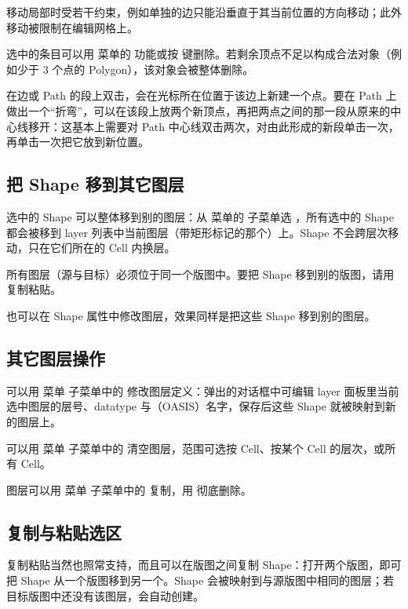 移动局部时受若干约束，例如单独的边只能沿垂直于其当前位置的方向移动；此外移动被限制在编辑网格上。

选中的条目可以用  菜单的  功能或按  键删除。若剩余顶点不足以构成合法对象（例如少于 3 个点的 Polygon），该对象会被整体删除。

在边或 Path 的段上双击，会在光标所在位置于该边上新建一个点。要在 Path 上做出一个“折弯”，可以在该段上放两个新顶点，再把两点之间的那一段从原来的中心线移开：这基本上需要对 Path 中心线双击两次，对由此形成的新段单击一次，再单击一次把它放到新位置。

\subsection{把 Shape 移到其它图层}\label{sec:move_layer_sel}

选中的 Shape 可以整体移到别的图层：从  菜单的  子菜单选 ，所有选中的 Shape 都会被移到 layer 列表中当前图层（带矩形标记的那个）上。Shape 不会跨层次移动，只在它们所在的 Cell 内换层。

所有图层（源与目标）必须位于同一个版图中。要把 Shape 移到别的版图，请用复制粘贴。

也可以在 Shape 属性中修改图层，效果同样是把这些 Shape 移到别的图层。

\subsection{其它图层操作}\label{sec:layer_ops}

可以用  菜单  子菜单中的  修改图层定义：弹出的对话框中可编辑 layer 面板里当前选中图层的层号、datatype 与（OASIS）名字，保存后这些 Shape 就被映射到新的图层上。

可以用  菜单  子菜单中的  清空图层，范围可选按 Cell、按某个 Cell 的层次，或所有 Cell。

图层可以用  菜单  子菜单中的  复制，用  彻底删除。

\subsection{复制与粘贴选区}\label{sec:copypaste_sel}

复制粘贴当然也照常支持，而且可以在版图之间复制 Shape：打开两个版图，即可把 Shape 从一个版图移到另一个。Shape 会被映射到与源版图中相同的图层；若目标版图中还没有该图层，会自动创建。

